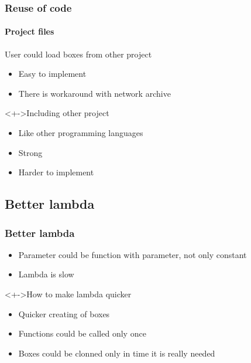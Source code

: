 \documentclass{beamer}
\begin{document}
\begin{frame}
	\frametitle{Reuse of code}
	\framesubtitle{Project files}
	\begin{block}{User could load boxes from other project}
		\begin{itemize}[<+->]
			\item Easy to implement
			\item There is workaround with network archive
		\end{itemize}
	\end{block}
	\begin{block}<+->{Including other project}
		\begin{itemize}[<+->]
			\item Like other programming languages
			\item Strong
			\item Harder to implement
		\end{itemize}
	\end{block}
\end{frame}

\subsection{Better lambda}
\begin{frame}
	\frametitle{Better lambda}
	\begin{block}{}
		\begin{itemize}[<+->]
			\item Parameter could be function with parameter, not only constant
			\item Lambda is slow
		\end{itemize}
	\end{block}
	\begin{block}<+->{How to make lambda quicker}
		\begin{itemize}[<+->]
			\item Quicker creating of boxes
			\item Functions could be called only once
			\item Boxes could be clonned only in time it is really needed
		\end{itemize}
	\end{block}
\end{frame}
\end{document}
